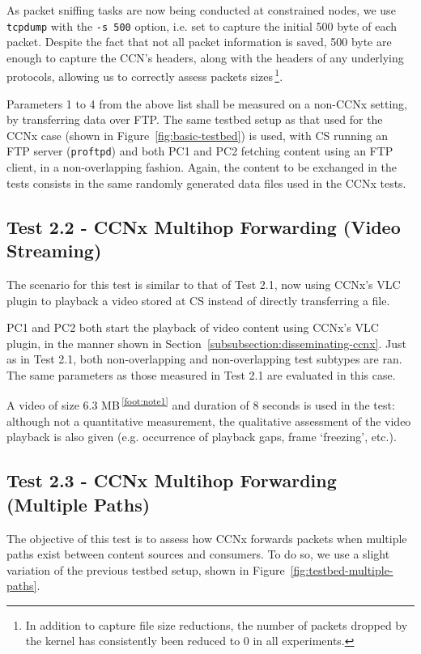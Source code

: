 As packet sniffing tasks are now being conducted at constrained nodes, we use 
\verb+tcpdump+ with the \verb+-s 500+ option, i.e. set to capture the initial 500 byte 
of each packet. Despite the fact that not all packet information is saved, 500 
byte are enough to capture the CCN's headers, along with the headers of any 
underlying protocols, allowing us to correctly assess packets sizes\,\footnote{In addition to capture file size reductions, the number of packets dropped by the kernel has consistently been reduced to 0 in all experiments.}.\vertbreak

Parameters 1 to 4 from the above list shall be measured on a non-CCNx 
setting, by transferring data over FTP. The same testbed setup as that 
used for the CCNx case (shown 
in Figure~\ref{fig:basic-testbed}) is used, with CS running an FTP server 
(\verb?proftpd?) and both PC1 and PC2 fetching content using 
an FTP client, in a non-overlapping fashion. Again, the content to be exchanged 
in the tests consists in the same randomly generated data files used in the CCNx tests.\vertbreak

\subsection{Test 2.2 - CCNx Multihop Forwarding (Video Streaming)}

The scenario for this test is similar to that of Test 2.1, now using CCNx's 
VLC plugin to playback a video stored at CS instead of directly transferring 
a file.\vertbreak

PC1 and PC2 both start the playback of video content using CCNx's VLC plugin, in 
the manner shown in Section~\ref{subsubsection:disseminating-ccnx}. Just as in 
Test 2.1, both non-overlapping and non-overlapping test subtypes are ran. The 
same parameters as those measured in Test 2.1 are evaluated in this case.\vertbreak

A 
video of size 6.3 MB\,\textsuperscript{\ref{foot:note1}} and duration of 8 seconds 
is used in the test: although not 
a quantitative measurement, the qualitative assessment of the video playback is 
also given (e.g. occurrence of playback gaps, frame `freezing', etc.).

\subsection{Test 2.3 - CCNx Multihop Forwarding (Multiple Paths)}
\label{subsec:mult-path}

The objective of this test is to assess how CCNx forwards packets when 
multiple paths exist between content sources and consumers. To do so, we use 
a slight variation of the previous testbed setup, shown in 
Figure~\ref{fig:testbed-multiple-paths}.\vertbreak


